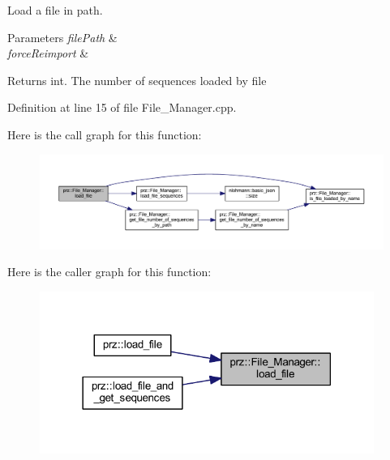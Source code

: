Load a file in path. 


\begin{DoxyParams}{Parameters}
{\em file\+Path} & \\
\hline
{\em force\+Reimport} & \\
\hline
\end{DoxyParams}
\begin{DoxyReturn}{Returns}
int. The number of sequences loaded by file 
\end{DoxyReturn}


Definition at line 15 of file File\+\_\+\+Manager.\+cpp.

Here is the call graph for this function\+:
\nopagebreak
\begin{figure}[H]
\begin{center}
\leavevmode
\includegraphics[width=350pt]{classprz_1_1_file___manager_aad862a71b68f6bb1870b1750f33e70f4_cgraph}
\end{center}
\end{figure}
Here is the caller graph for this function\+:
\nopagebreak
\begin{figure}[H]
\begin{center}
\leavevmode
\includegraphics[width=309pt]{classprz_1_1_file___manager_aad862a71b68f6bb1870b1750f33e70f4_icgraph}
\end{center}
\end{figure}
\mbox{\label{classprz_1_1_file___manager_a930093b7f609e4f9cf755efb0d91ef46}} 
